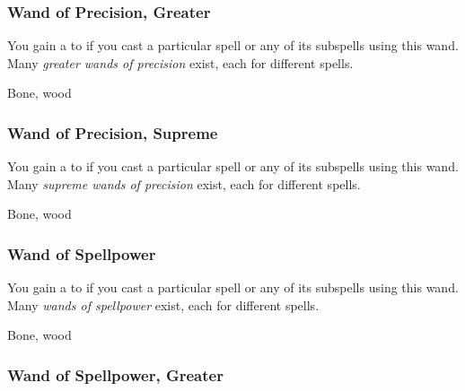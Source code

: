 \lowercase{\hypertarget{item:Wand of Precision, Greater}{}}\label{item:Wand of Precision, Greater}
\hypertarget{item:Wand of Precision, Greater}{\subsubsection{Wand of Precision, Greater\hfill{}}}

You gain a   to  if you cast a particular spell or any of its subspells using this wand.
Many \textit{greater wands of precision} exist, each for different spells.



 


 Bone, wood


\lowercase{\hypertarget{item:Wand of Precision, Supreme}{}}\label{item:Wand of Precision, Supreme}
\hypertarget{item:Wand of Precision, Supreme}{\subsubsection{Wand of Precision, Supreme\hfill{}}}

You gain a   to  if you cast a particular spell or any of its subspells using this wand.
Many \textit{supreme wands of precision} exist, each for different spells.



 


 Bone, wood


\lowercase{\hypertarget{item:Wand of Spellpower}{}}\label{item:Wand of Spellpower}
\hypertarget{item:Wand of Spellpower}{\subsubsection{Wand of Spellpower\hfill{}}}

You gain a   to  if you cast a particular spell or any of its subspells using this wand.
Many \textit{wands of spellpower} exist, each for different spells.



 


 Bone, wood


\lowercase{\hypertarget{item:Wand of Spellpower, Greater}{}}\label{item:Wand of Spellpower, Greater}
\hypertarget{item:Wand of Spellpower, Greater}{\subsubsection{Wand of Spellpower, Greater\hfill{}}}

